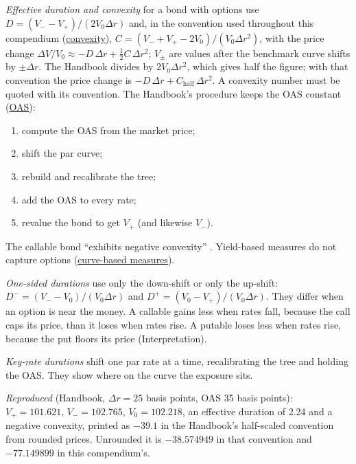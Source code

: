 \begin{qfmethod}\label{meth:embedded-option-effective-duration}
 \emph{Effective duration and convexity} for a bond with options use $D=(V_--V_+)/(2V_0\Delta r)$ and, in the convention used throughout this compendium (\hyperref[meth:convexity-portfolio-duration]{convexity}), $C=(V_-+V_+-2V_0)/(V_0\Delta r^2)$, with the price change $\Delta V/V_0\approx-D\,\Delta r+\tfrac12C\,\Delta r^2$; $V_\pm$ are values after the benchmark curve shifts by $\pm\Delta r$. The Handbook divides by $2V_0\Delta r^2$, which gives half the figure; with that convention the price change is $-D\,\Delta r+C_{\text{half}}\,\Delta r^2$. A convexity number must be quoted with its convention. The Handbook's procedure keeps the OAS constant (\hyperref[meth:option-adjusted-spread]{OAS}):
\begin{enumerate}
\item compute the OAS from the market price;
\item shift the par curve;
\item rebuild and recalibrate the tree;
\item add the OAS to every rate;
\item revalue the bond to get $V_+$ (and likewise $V_-$).
\end{enumerate}
The callable bond ``exhibits negative convexity'' \citep[chap.~36, pp.~850--851]{s7-fabozzifixed}. Yield-based measures do not capture options (\hyperref[meth:curve-based-empirical-duration]{curve-based measures}).

\emph{One-sided durations} use only the down-shift or only the up-shift: $D^-=(V_--V_0)/(V_0\Delta r)$ and $D^+=(V_0-V_+)/(V_0\Delta r)$. They differ when an option is near the money. A callable gains less when rates fall, because the call caps its price, than it loses when rates rise. A putable loses less when rates rise, because the put floors its price (Interpretation).

\emph{Key-rate durations} shift one par rate at a time, recalibrating the tree and holding the OAS. They show where on the curve the exposure sits.

 \emph{Reproduced} (Handbook, $\Delta r=25$ basis points, OAS 35 basis points): $V_+=101.621$, $V_-=102.765$, $V_0=102.218$, an effective duration of 2.24 and a negative convexity, printed as $-39.1$ in the Handbook's half-scaled convention from rounded prices. Unrounded it is $-38.574949$ in that convention and $-77.149899$ in this compendium's.


\end{qfmethod}
